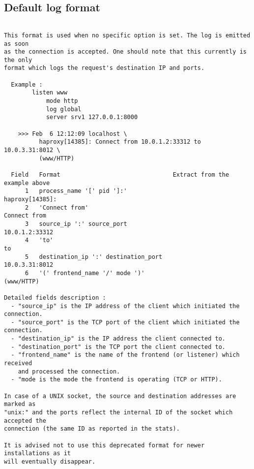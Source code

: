 
\subsection{Default log format}

\begin{verbatim}

This format is used when no specific option is set. The log is emitted as soon
as the connection is accepted. One should note that this currently is the only
format which logs the request's destination IP and ports.

  Example :
        listen www
            mode http
            log global
            server srv1 127.0.0.1:8000

    >>> Feb  6 12:12:09 localhost \
          haproxy[14385]: Connect from 10.0.1.2:33312 to 10.0.3.31:8012 \
          (www/HTTP)

  Field   Format                                Extract from the example above
      1   process_name '[' pid ']:'                            haproxy[14385]:
      2   'Connect from'                                          Connect from
      3   source_ip ':' source_port                             10.0.1.2:33312
      4   'to'                                                              to
      5   destination_ip ':' destination_port                   10.0.3.31:8012
      6   '(' frontend_name '/' mode ')'                            (www/HTTP)

Detailed fields description :
  - "source_ip" is the IP address of the client which initiated the connection.
  - "source_port" is the TCP port of the client which initiated the connection.
  - "destination_ip" is the IP address the client connected to.
  - "destination_port" is the TCP port the client connected to.
  - "frontend_name" is the name of the frontend (or listener) which received
    and processed the connection.
  - "mode is the mode the frontend is operating (TCP or HTTP).

In case of a UNIX socket, the source and destination addresses are marked as
"unix:" and the ports reflect the internal ID of the socket which accepted the
connection (the same ID as reported in the stats).

It is advised not to use this deprecated format for newer installations as it
will eventually disappear.


\end{verbatim}
